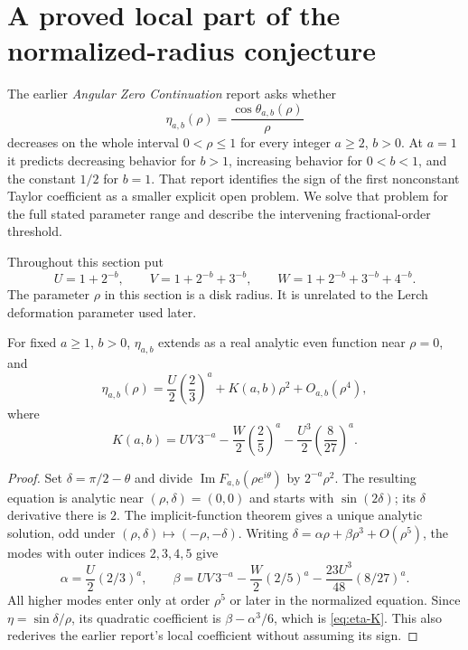 \section{A proved local part of the normalized-radius conjecture}
\label{sec:local-radius}

The earlier \emph{Angular Zero Continuation} report \cite{AngularBaseline}
asks whether
\[
 \eta_{a,b}(\rho)=\frac{\cos\theta_{a,b}(\rho)}{\rho}
\]
decreases on the whole interval $0<\rho\le1$ for every integer
$a\ge2$, $b>0$. At $a=1$ it predicts decreasing behavior for $b>1$,
increasing behavior for $0<b<1$, and the constant $1/2$ for $b=1$.
That report identifies the sign of the first nonconstant Taylor
coefficient as a smaller explicit open problem. We solve that problem
for the full stated parameter range and describe the intervening
fractional-order threshold.

Throughout this section put
\[
 U=1+2^{-b},\qquad V=1+2^{-b}+3^{-b},\qquad
 W=1+2^{-b}+3^{-b}+4^{-b}.
\]
The parameter $\rho$ in this section is a disk radius. It is unrelated
to the Lerch deformation parameter used later.

\begin{lemma}\label{lem:radius-coefficient}
For fixed $a\ge1$, $b>0$, $\eta_{a,b}$ extends as a real analytic
even function near $\rho=0$, and
\begin{equation}\label{eq:eta-expansion}
 \eta_{a,b}(\rho)=\frac U2\left(\frac23\right)^a
                    +K(a,b)\rho^2+O_{a,b}(\rho^4),
\end{equation}
where
\begin{equation}\label{eq:eta-K}
 K(a,b)=UV\,3^{-a}-\frac W2\left(\frac25\right)^a
                  -\frac{U^3}{2}\left(\frac8{27}\right)^a.
\end{equation}
\end{lemma}

\begin{proof}
Set $\delta=\pi/2-\theta$ and divide
$\operatorname{Im}F_{a,b}(\rho e^{i\theta})$ by $2^{-a}\rho^2$.
The resulting equation is analytic near $(\rho,\delta)=(0,0)$
and starts with $\sin(2\delta)$; its $\delta$ derivative there is
$2$. The implicit-function theorem gives a unique analytic solution,
odd under $(\rho,\delta)\mapsto(-\rho,-\delta)$.
Writing $\delta=\alpha\rho+\beta\rho^3+O(\rho^5)$, the modes
with outer indices $2,3,4,5$ give
\[
 \alpha=\frac U2(2/3)^a,\qquad
 \beta=UV\,3^{-a}-\frac W2(2/5)^a
                   -\frac{23U^3}{48}(8/27)^a.
\]
All higher modes enter only at order $\rho^5$ or later in the
normalized equation. Since $\eta=\sin\delta/\rho$, its quadratic
coefficient is $\beta-\alpha^3/6$, which is \eqref{eq:eta-K}.
This also rederives the earlier report's local coefficient without
assuming its sign.
\end{proof}


